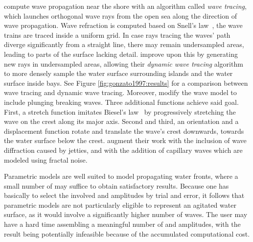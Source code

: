 \citet{Ts'o:1987} compute wave propagation near the shore with an algorithm
called \emph{wave tracing}, which launches orthogonal wave rays from the open
sea along the direction of wave propagation. Wave refraction is computed based
on Snell's law~\citep{book:huygenstreatiseonlight}, the wave trains are traced
inside a uniform grid.
In case rays tracing the waves' path diverge
significantly from a straight line, there may remain undersampled areas,
leading to parts of the surface lacking detail. \citet{Gonzato:1997} improve
upon this by generating new rays in undersampled areas, allowing their
\emph{dynamic wave tracing} algorithm to more densely sample the water surface
surrounding islands and the water surface inside bays. See Figure
\ref{fig:gonzato1997:results} for a comparison between wave tracing and
dynamic wave tracing. Moreover,
\citeauthor{Gonzato:1997} modify the wave model to include plunging breaking
waves. Three additional functions achieve said goal.
First, a stretch function imitates Biesel's law~\citep{Biesel:1952} by
progressively stretching the wave on the crest along its major axis. Second and
third, an orientation and a displacement function rotate and translate
the wave's crest downwards, towards the water surface below the crest.
\citet{Gonzato:2000} augment their work with the inclusion of wave diffraction
caused by jetties, and with the addition of capillary waves which are modeled
using fractal noise.

Parametric models are well suited to model propagating water fronts, where a
small number of \wavenumbers may suffice to obtain satisfactory results.
Because one has basically to select the involved \wavelengths and amplitudes
by trial and error, it follows that parametric models are not particularly
eligible to represent an agitated water surface, as it would involve a
significantly higher number of waves. The user may have a hard time assembling a
meaningful number of \wavenumbers and amplitudes, with the result being
potentially infeasible because of the accumulated computational cost.
%
%
